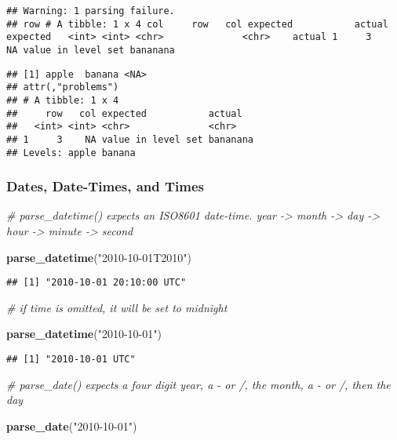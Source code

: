 \documentclass[]{article}
\newenvironment{Shaded}{\begin{snugshade}}{\end{snugshade}}
\newcommand{\KeywordTok}[1]{\textcolor[rgb]{0.13,0.29,0.53}{\textbf{#1}}}
\newcommand{\StringTok}[1]{\textcolor[rgb]{0.31,0.60,0.02}{#1}}
\newcommand{\CommentTok}[1]{\textcolor[rgb]{0.56,0.35,0.01}{\textit{#1}}}
\newcommand{\NormalTok}[1]{#1}
\begin{document}
\begin{verbatim}
## Warning: 1 parsing failure.
## row # A tibble: 1 x 4 col     row   col expected           actual   expected   <int> <int> <chr>              <chr>    actual 1     3    NA value in level set bananana
\end{verbatim}

\begin{verbatim}
## [1] apple  banana <NA>  
## attr(,"problems")
## # A tibble: 1 x 4
##     row   col expected           actual  
##   <int> <int> <chr>              <chr>   
## 1     3    NA value in level set bananana
## Levels: apple banana
\end{verbatim}

\subsubsection{Dates, Date-Times, and
Times}\label{dates-date-times-and-times}

\begin{Shaded}
\begin{Highlighting}[]
\CommentTok{# parse_datetime() expects an ISO8601 date-time. year -> month -> day -> hour -> minute -> second}

\KeywordTok{parse_datetime}\NormalTok{(}\StringTok{"2010-10-01T2010"}\NormalTok{)}
\end{Highlighting}
\end{Shaded}

\begin{verbatim}
## [1] "2010-10-01 20:10:00 UTC"
\end{verbatim}

\begin{Shaded}
\begin{Highlighting}[]
\CommentTok{# if time is omitted, it will be set to midnight }

\KeywordTok{parse_datetime}\NormalTok{(}\StringTok{"2010-10-01"}\NormalTok{)}
\end{Highlighting}
\end{Shaded}

\begin{verbatim}
## [1] "2010-10-01 UTC"
\end{verbatim}

\begin{Shaded}
\begin{Highlighting}[]
\CommentTok{# parse_date() expects a four digit year, a - or /, the month, a - or /, then the day}

\KeywordTok{parse_date}\NormalTok{(}\StringTok{"2010-10-01"}\NormalTok{)}
\end{Highlighting}
\end{Shaded}
\end{document}
